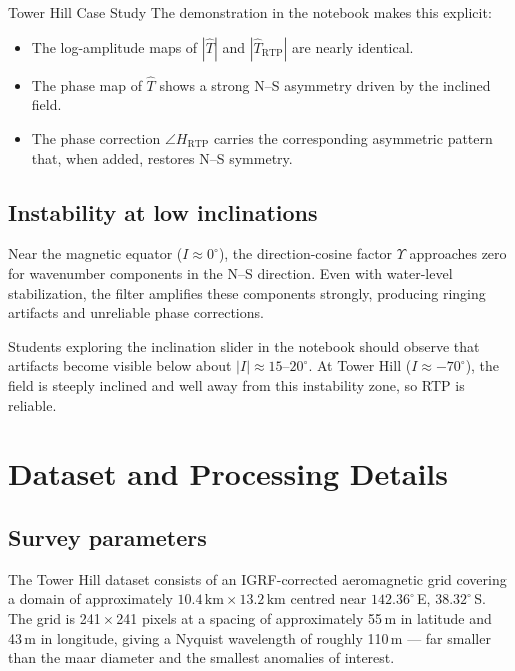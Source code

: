 \begin{activity}{Tower Hill Case Study}
The demonstration in the notebook makes this explicit:
\begin{itemize}
  \item The log-amplitude maps of $|\hat{T}|$ and $|\hat{T}_\text{RTP}|$ are
        nearly identical.
  \item The phase map of $\hat{T}$ shows a strong N--S asymmetry driven by
        the inclined field.
  \item The phase correction $\angle H_\text{RTP}$ carries the corresponding
        asymmetric pattern that, when added, restores N--S symmetry.
\end{itemize}

\subsection{Instability at low inclinations}

Near the magnetic equator ($I \approx 0^\circ$), the direction-cosine factor
$\Upsilon$ approaches zero for wavenumber components in the N--S direction.
Even with water-level stabilization, the filter amplifies these components
strongly, producing ringing artifacts and unreliable phase corrections.

Students exploring the inclination slider in the notebook should observe that
artifacts become visible below about $|I| \approx 15$--$20^\circ$.
At Tower Hill ($I \approx -70^\circ$), the field is steeply inclined and well
away from this instability zone, so RTP is reliable.

\section{Dataset and Processing Details}

\subsection{Survey parameters}

The Tower Hill dataset consists of an IGRF-corrected aeromagnetic grid
covering a domain of approximately $10.4\,\text{km} \times 13.2\,\text{km}$
centred near $142.36^\circ$\,E, $38.32^\circ$\,S.
The grid is 241\,$\times$\,241 pixels at a spacing of approximately
55\,m in latitude and 43\,m in longitude, giving a Nyquist wavelength of
roughly 110\,m --- far smaller than the maar diameter and the smallest
anomalies of interest.


\end{activity}
